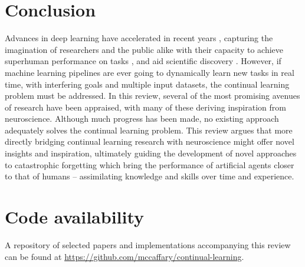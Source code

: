 \documentclass{article} %
\begin{document}
\section*{Conclusion}

Advances in deep learning have accelerated in recent years \citep{krizhevsky2012imagenet, vaswani2017attention}, capturing the imagination of researchers and the public alike with their capacity to achieve superhuman performance on tasks \citep{silver2016mastering}, and aid scientific discovery \citep{senior2020improved}. However, if machine learning pipelines are ever going to dynamically learn new tasks in real time, with interfering goals and multiple input datasets, the continual learning problem must be addressed. In this review, several of the most promising avenues of research have been appraised, with many of these deriving inspiration from neuroscience. Although much progress has been made, no existing approach adequately solves the continual learning problem. This review argues that more directly bridging continual learning research with neuroscience might offer novel insights and inspiration, ultimately guiding the development of novel approaches to catastrophic forgetting which bring the performance of artificial agents closer to that of humans – assimilating knowledge and skills over time and experience.

\section*{Code availability}
A repository of selected papers and implementations accompanying this review can be found at \url{https://github.com/mccaffary/continual-learning}.




\end{document}
